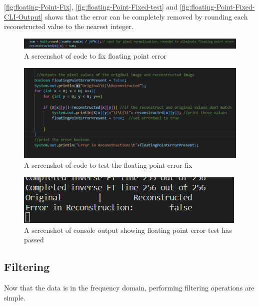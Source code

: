     \autoref{fig:floating-Point-Fix}, \autoref{fig:floating-Point-Fixed-test} and \autoref{fig:floating-Point-Fixed-CLI-Output} shows that the error can be completely removed by rounding each reconstructed value to the nearest integer.
    \newpage
    \begin{figure}[H]
        \centering
        \includegraphics[width=1\columnwidth]{Figures/Week 1/W1-SimpleFT-InverseDFT-Floating-Point-Fix.png}
        \caption{A screenshot of code to fix floating point error}
        \label{fig:floating-Point-Fix}
    \end{figure}
    \begin{figure}[H]
            \centering
            \includegraphics[width=1\columnwidth]{Figures/Week 1/W1-SimpleFT-InverseDFT-Test-2.0-code.png}
            \caption{A screenshot of code to test the floating point error fix}
            \label{fig:floating-Point-Fixed-test}
        \end{figure}   
    \begin{figure}[H]
            \centering
            \includegraphics[width=0.8\columnwidth]{Figures/Week 1/W1-SimpleFT-InverseDFT-Test-2.0-CLI-Output.png}
            \caption{A screenshot of console output showing floating point error test has passed}
            \label{fig:floating-Point-Fixed-CLI-Output}
        \end{figure}
        
   
    \newpage
    \subsection{Filtering}
    Now that the data is in the frequency domain, performing filtering operations are simple. 
    
